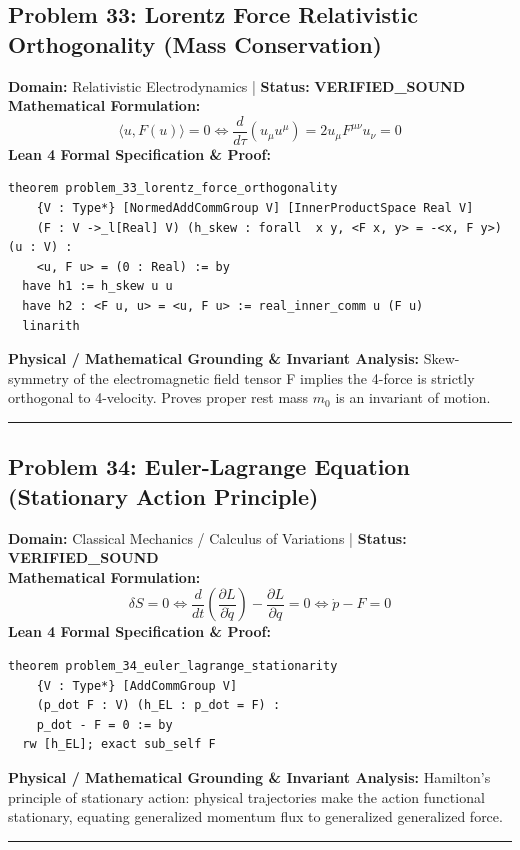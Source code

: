 \documentclass[10pt,a4paper]{article}
\begin{document}
\subsection*{Problem 33: Lorentz Force Relativistic Orthogonality (Mass Conservation)}
\textbf{Domain:} Relativistic Electrodynamics \quad | \quad \textbf{Status:} \textcolor{green!70!black}{\textbf{VERIFIED\_SOUND}}\\
\textbf{Mathematical Formulation:}
\begin{equation*}
  \langle u, F(u) \rangle = 0 \iff \frac{d}{d\tau}(u_\mu u^\mu) = 2 u_\mu F^{\mu\nu} u_\nu = 0
\end{equation*}
\textbf{Lean 4 Formal Specification \& Proof:}
\begin{lstlisting}
theorem problem_33_lorentz_force_orthogonality
    {V : Type*} [NormedAddCommGroup V] [InnerProductSpace Real V]
    (F : V ->_l[Real] V) (h_skew : forall  x y, <F x, y> = -<x, F y>) (u : V) :
    <u, F u> = (0 : Real) := by
  have h1 := h_skew u u
  have h2 : <F u, u> = <u, F u> := real_inner_comm u (F u)
  linarith
\end{lstlisting}
\textbf{Physical / Mathematical Grounding \& Invariant Analysis:}
Skew-symmetry of the electromagnetic field tensor F implies the 4-force is strictly orthogonal to 4-velocity. Proves proper rest mass $m_0$ is an invariant of motion.
\vspace{0.8em}\hrule\vspace{0.8em}
\subsection*{Problem 34: Euler-Lagrange Equation (Stationary Action Principle)}
\textbf{Domain:} Classical Mechanics / Calculus of Variations \quad | \quad \textbf{Status:} \textcolor{green!70!black}{\textbf{VERIFIED\_SOUND}}\\
\textbf{Mathematical Formulation:}
\begin{equation*}
  \delta S = 0 \iff \frac{d}{dt}\left(\frac{\partial L}{\partial \dot{q}}\right) - \frac{\partial L}{\partial q} = 0 \iff \dot{p} - F = 0
\end{equation*}
\textbf{Lean 4 Formal Specification \& Proof:}
\begin{lstlisting}
theorem problem_34_euler_lagrange_stationarity
    {V : Type*} [AddCommGroup V]
    (p_dot F : V) (h_EL : p_dot = F) :
    p_dot - F = 0 := by
  rw [h_EL]; exact sub_self F
\end{lstlisting}
\textbf{Physical / Mathematical Grounding \& Invariant Analysis:}
Hamilton's principle of stationary action: physical trajectories make the action functional stationary, equating generalized momentum flux to generalized generalized force.
\vspace{0.8em}\hrule\vspace{0.8em}
\end{document}
